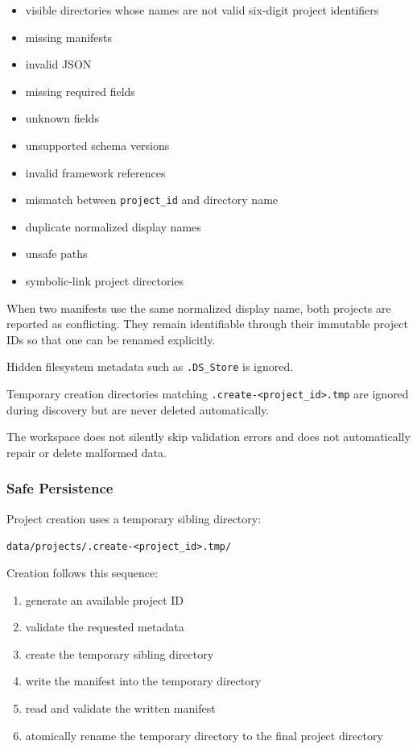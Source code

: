 \begin{itemize}
\tightlist
\item
  visible directories whose names are not valid six-digit project identifiers
\item
  missing manifests
\item
  invalid JSON
\item
  missing required fields
\item
  unknown fields
\item
  unsupported schema versions
\item
  invalid framework references
\item
  mismatch between \texttt{project\_id} and directory name
\item
  duplicate normalized display names
\item
  unsafe paths
\item
  symbolic-link project directories
\end{itemize}

When two manifests use the same normalized display name, both projects are reported as conflicting. They remain identifiable through their immutable project IDs so that one can be renamed explicitly.

Hidden filesystem metadata such as \texttt{.DS\_Store} is ignored.

Temporary creation directories matching \texttt{.create-\textless{}project\_id\textgreater{}.tmp} are ignored during discovery but are never deleted automatically.

The workspace does not silently skip validation errors and does not automatically repair or delete malformed data.

\hypertarget{safe-persistence}{%
\subsubsection{Safe Persistence}\label{safe-persistence}}

Project creation uses a temporary sibling directory:

\texttt{data/projects/.create-\textless{}project\_id\textgreater{}.tmp/}

Creation follows this sequence:

\begin{enumerate}
\def\labelenumi{\arabic{enumi}.}
\tightlist
\item
  generate an available project ID
\item
  validate the requested metadata
\item
  create the temporary sibling directory
\item
  write the manifest into the temporary directory
\item
  read and validate the written manifest
\item
  atomically rename the temporary directory to the final project directory
\end{enumerate}

